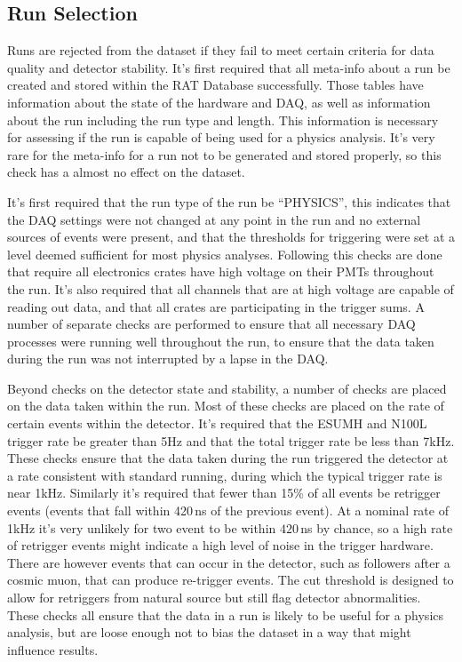 \subsection{Run Selection}
Runs are rejected from the dataset if they fail to meet certain criteria
for data quality and detector stability.
It's first required that all meta-info about a run be created and stored
within the RAT Database successfully.
Those tables have information about the state of the hardware and DAQ, as
well as information about the run including the run type and length.
This information is necessary for assessing if the run is capable of being
used for a physics analysis.
It's very rare for the meta-info for a run not to be generated and stored
properly, so this check has a almost no effect on the dataset.


It's first required that the run type of the run be ``PHYSICS'', this indicates
that the DAQ settings were not changed at any point in the run and no external
sources of events were present, and that the thresholds for triggering were set
at a level deemed sufficient for most physics analyses.
Following this checks are done
that require all electronics crates have high voltage on their PMTs throughout
the run.
It's also required that all channels that are at high voltage are capable of
reading out data, and that all crates are participating in the trigger sums.
A number of separate checks are performed to ensure that all necessary DAQ
processes were running well throughout the run, to ensure that the data taken
during the run was not interrupted by a lapse in the DAQ.\@

Beyond checks on the detector state and stability, a number of checks
are placed on the data taken within the run.
Most of these checks are placed on the rate of certain events within the detector.
It's required that the ESUMH and N100L trigger rate be greater than 5Hz and
that the total trigger rate be less than 7kHz.
These checks ensure that the data taken during the run triggered the detector
at a rate consistent with standard running, during which the typical trigger
rate is near 1kHz.
Similarly it's required that fewer than 15\% of all events be retrigger events
(events that fall within 420\,ns of the previous event).
At a nominal rate of 1kHz it's very unlikely for two event to be within $420$\,ns
by chance, so a high rate of retrigger events might indicate a high level
of noise in the trigger hardware. There are however events that can occur
in the detector, such as followers after a cosmic muon, that can produce
re-trigger events.
The cut threshold is designed to allow for retriggers from natural source but
still flag detector abnormalities.
These checks all ensure that the data in a run is likely to be useful for
a physics analysis, but are loose enough not to bias the dataset in a way that
might influence results.
